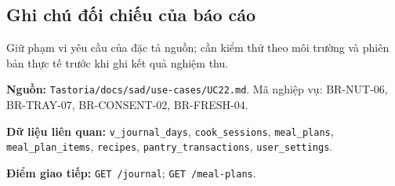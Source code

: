 \subsection{Ghi chú đối chiếu của báo cáo}
Giữ phạm vi yêu cầu của đặc tả nguồn; cần kiểm thử theo môi trường và phiên bản thực tế trước khi ghi kết quả nghiệm thu.

\textbf{Nguồn:} {\small\texttt{Tastoria/\allowbreak{}\allowbreak{}docs/\allowbreak{}\allowbreak{}sad/\allowbreak{}\allowbreak{}use-\allowbreak{}cases/\allowbreak{}\allowbreak{}UC22.\allowbreak{}md}}. Mã nghiệp vụ: BR-\allowbreak{}NUT-\allowbreak{}06, BR-\allowbreak{}TRAY-\allowbreak{}07, BR-\allowbreak{}CONSENT-\allowbreak{}02, BR-\allowbreak{}FRESH-\allowbreak{}04.

\textbf{Dữ liệu liên quan:} {\small\texttt{v\_\allowbreak{}\allowbreak{}journal\_\allowbreak{}\allowbreak{}days}}, {\small\texttt{cook\_\allowbreak{}\allowbreak{}sessions}}, {\small\texttt{meal\_\allowbreak{}\allowbreak{}plans}}, {\small\texttt{meal\_\allowbreak{}\allowbreak{}plan\_\allowbreak{}\allowbreak{}items}}, {\small\texttt{recipes}}, {\small\texttt{pantry\_\allowbreak{}\allowbreak{}transactions}}, {\small\texttt{user\_\allowbreak{}\allowbreak{}settings}}.

\textbf{Điểm giao tiếp:} {\small\texttt{GET /\allowbreak{}\allowbreak{}journal}}; {\small\texttt{GET /\allowbreak{}\allowbreak{}meal-\allowbreak{}plans}}.
